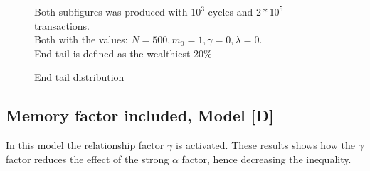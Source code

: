 \documentclass[a4paper,11pt]{article}
\begin{document}
\begin{figure}[H]
  \hfill
  \caption{End tail distribution}
{\small Both subfigures was produced with $10^3$ cycles and $2*10^5$ transactions. \\Both with the values: $N = 500, m_0 = 1, \gamma = 0, \lambda = 0$. \\End tail is defined as the wealthiest 20\% }
\end{figure}

	\subsection{Memory factor included, Model [D]}
In this model the relationship factor $\gamma$ is activated. These results shows how the $\gamma$	factor reduces the effect of the strong $\alpha$ factor, hence decreasing the inequality.
	
\end{document}
